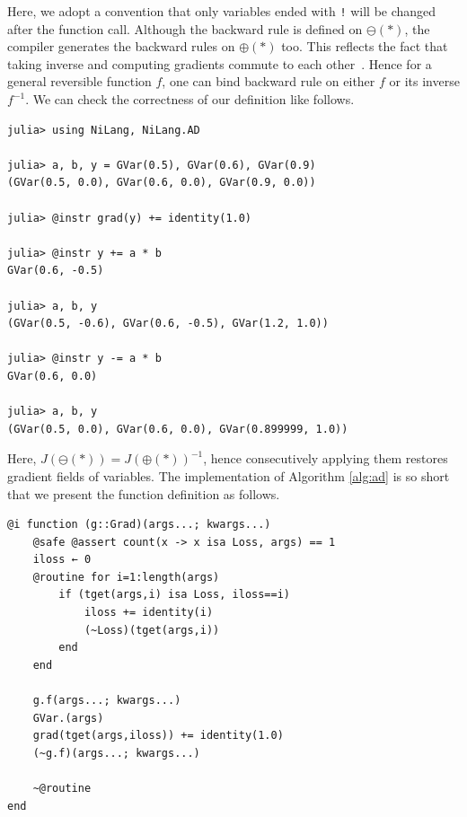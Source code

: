 \documentclass[aps,twocolumn,longbibliography,english,superscriptaddress]{revtex4-1}
\newcommand{\<}{\langle}
\renewcommand{\>}{\rangle}
\theoremstyle{definition}\newtheorem{definition}{\textit{Definition}}
\begin{document}
Here, we adopt a convention that only variables ended with \texttt{!} will be changed after the function call.
Although the backward rule is defined on $\ominus(*)$, the compiler generates the backward rules on $\oplus(*)$ too.
This reflects the fact that taking inverse and computing gradients commute to each other~\cite{Mcinerney2015}. Hence for a general reversible function $f$, one can bind backward rule on either $f$ or its inverse $f^{-1}$.
We can check the correctness of our definition like follows.

\begin{minipage}{.44\textwidth}
\begin{lstlisting}[mathescape=true]
julia> using NiLang, NiLang.AD

julia> a, b, y = GVar(0.5), GVar(0.6), GVar(0.9)
(GVar(0.5, 0.0), GVar(0.6, 0.0), GVar(0.9, 0.0))

julia> @instr grad(y) += identity(1.0)

julia> @instr y += a * b
GVar(0.6, -0.5)

julia> a, b, y
(GVar(0.5, -0.6), GVar(0.6, -0.5), GVar(1.2, 1.0))

julia> @instr y -= a * b
GVar(0.6, 0.0)

julia> a, b, y
(GVar(0.5, 0.0), GVar(0.6, 0.0), GVar(0.899999, 1.0))
\end{lstlisting}
\end{minipage}

Here, $J(\ominus(*)) = J(\oplus(*))^{-1}$, hence consecutively applying them restores gradient fields of variables.
The implementation of Algorithm \ref{alg:ad} is so short that we present the function definition as follows.

\begin{minipage}{.44\textwidth}
\begin{lstlisting}
@i function (g::Grad)(args...; kwargs...)
    @safe @assert count(x -> x isa Loss, args) == 1
    iloss ← 0
    @routine for i=1:length(args)
        if (tget(args,i) isa Loss, iloss==i)
            iloss += identity(i)
            (~Loss)(tget(args,i))
        end
    end

    g.f(args...; kwargs...)
    GVar.(args)
    grad(tget(args,iloss)) += identity(1.0)
    (~g.f)(args...; kwargs...)

    ~@routine
end
\end{lstlisting}\label{lst:ad}
\end{minipage}
\end{document}
